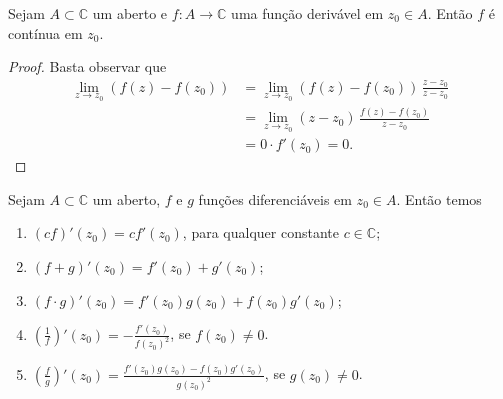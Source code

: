 \begin{proposicao}\label{prop-diferenciavel-continua}
Sejam $A\subset\mathbb{C}$ um aberto e  $f:A\to\mathbb{C}$ uma função derivável em $z_0\in A$.
Então $f$ é contínua em $z_0$.
\end{proposicao}
\begin{proof}
Basta observar que 
\begin{align*}
\lim_{z\to z_0} (f(z)-f(z_0))
&=
\lim_{z\to z_0} (f(z)-f(z_0))\, \frac{z-z_0}{z-z_0}
\\
&=
\lim_{z\to z_0}  (z-z_0)\, \frac{f(z)-f(z_0)}{z-z_0}
\\
&=
0\cdot f'(z_0)=0.
\end{align*}
\end{proof}


\begin{proposicao}\label{prop-derivada}
Sejam $A\subset\mathbb{C}$ um aberto, $f$ e $g$ funções diferenciáveis em $z_0\in A$. 
Então temos 
\begin{enumerate}
	\item $(cf)'(z_0) = cf'(z_0)$, para qualquer constante $c\in\mathbb{C}$;
	\item $(f+g)'(z_0) = f'(z_0)+g'(z_0)$;
	\item $(f\cdot g)'(z_0) = f'(z_0)g(z_0)+f(z_0)g'(z_0)$;
	\item $\displaystyle\left( \frac{1}{f} \right)'(z_0) = -\frac{f'(z_0)}{f(z_0)^2}$, se $f(z_0)\neq 0$.
	\item $\displaystyle\left( \frac{f}{g} \right)'(z_0) = \frac{f'(z_0)g(z_0)-f(z_0)g'(z_0)}{g(z_0)^2}$, se $g(z_0)\neq 0$.
\end{enumerate}
\end{proposicao}

